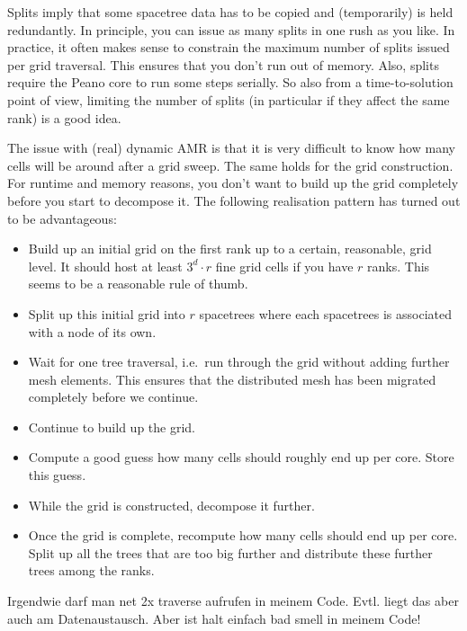 \begin{remark}
 Splits imply that some spacetree data has to be copied and (temporarily) is
 held redundantly. In principle, you can issue as many splits in one rush as you
 like. In practice, it often makes sense to constrain the maximum number of
 splits issued per grid traversal. This ensures that you don't run out of
 memory. Also, splits require the Peano core to run some steps serially. 
 So also from a time-to-solution point of view, limiting the number of splits
 (in particular if they affect the same rank) is a good idea.
\end{remark}



The issue with (real) dynamic AMR is that it is very difficult to know how many
cells will be around after a grid sweep.
The same holds for the grid construction.
For runtime and memory reasons, you don't want to build up the grid completely
before you start to decompose it.
The following realisation pattern has turned out to be advantageous:
\begin{itemize}
  \item Build up an initial grid on the first rank up to a certain, reasonable,
  grid level. It should host at least $3^d \cdot r$ fine grid cells if you have
  $r$ ranks. This seems to be a reasonable rule of thumb.
  \item Split up this initial grid into $r$ spacetrees where each spacetrees is
  associated with a node of its own.
  \item Wait for one tree traversal, i.e.~run through the grid without adding
  further mesh elements. This ensures that the distributed mesh has been
  migrated completely before we continue.
  \item Continue to build up the grid.
  \item Compute a good guess how many cells should roughly end up per core.
  Store this guess.
  \item While the grid is constructed, decompose it further.
  \item Once the grid is complete, recompute how many cells should end up per
  core. Split up all the trees that are too big further and distribute these
  further trees among the ranks.
\end{itemize}



\begin{remark}
Irgendwie darf man net 2x traverse aufrufen in meinem Code. Evtl. liegt das aber
auch am Datenaustausch. Aber ist halt einfach bad smell in meinem Code!
\end{remark}

 
